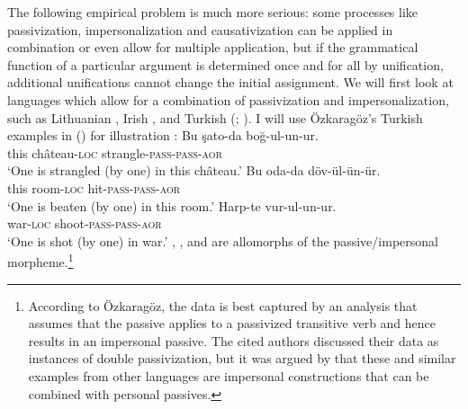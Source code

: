 The following empirical problem is much more serious: some processes like passivization, impersonalization and
causati\-vization can be applied in combination or even allow for multiple application, but if the grammatical function of a particular
argument is determined once and for all by unification, additional unifications cannot change the
initial assignment. 
We will first look at languages which allow for a combination of passivization
and impersonalization, such as Lithuanian \citep[Section~5]{Timberlake82a}, Irish \citep{Noonan94a}, and Turkish (\citealp{Ozkaragoez86a};
\citealp[Section~2.3.3]{Knecht85a-u}).  I will use Özkaragöz's Turkish examples in () for
illustration \citeyearpar[]{Ozkaragoez86a}:
\eal\label{ex-double-passivization}
\ex\label{ex-double-passivization-strangle}
\gll Bu şato-da boğ-ul-un-ur.\\
     this château-\textsc{loc} strangle-\textsc{pass}-\textsc{pass}-\textsc{aor}\\
\glt `One is strangled (by one) in this château.'
\ex\label{ex-double-passivization-hit}
\gll Bu oda-da döv-ül-ün-ür.\\
     this room-\textsc{loc} hit-\textsc{pass}-\textsc{pass}-\textsc{aor}\\
\glt `One is beaten (by one) in this room.'
\ex
\gll Harp-te vur-ul-un-ur.\\
     war-\textsc{loc} shoot-\textsc{pass}-\textsc{pass}-\textsc{aor}\\
\glt `One is shot (by one) in war.'
\zl
{}, , and  are allomorphs of the passive/impersonal
morpheme.\footnote{%
  According to Özkara\-göz, the data is best captured by an analysis that assumes that the passive
  applies to a passivized transitive verb and hence results in an impersonal passive. The cited authors discussed their data as instances of double passivization, but it was
argued by \citet{Blevins2003a} that these and similar examples from other languages are impersonal
constructions that can be combined with personal passives.}

